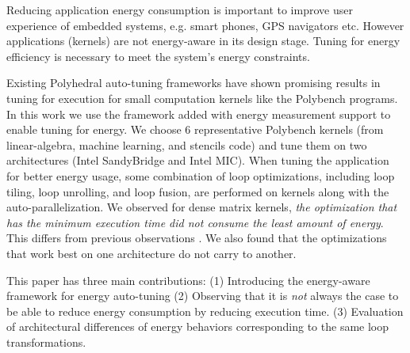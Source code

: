 Reducing application energy consumption is important to improve user experience of 
embedded systems, e.g. smart phones, GPS navigators etc.  
However applications (kernels) are not energy-aware in its design stage. Tuning
for energy efficiency is necessary to meet the system's energy constraints.

Existing Polyhedral auto-tuning frameworks have shown promising results in tuning for execution
for small computation kernels like the Polybench programs\cite{EJ2012}. 
In this work we use the framework added with energy measurement support to enable tuning for energy.
We choose 6 representative Polybench kernels (from linear-algebra, machine learning, and stencils code) 
and tune them on two architectures (Intel SandyBridge and Intel MIC).
When tuning the application for better energy usage, some combination of loop optimizations, including loop 
tiling, loop unrolling, and loop fusion, are performed on kernels along with the auto-parallelization.
We observed for dense matrix kernels, \emph{the optimization that has the minimum execution time 
did not consume the least amount of energy}. This differs from previous observations \cite{Wang2014}.
We also found that the optimizations that work best on one architecture do not carry to another.  
 
This paper has three main contributions: 
(1) Introducing the energy-aware framework for energy auto-tuning
(2) Observing that it is \emph{not} always the case to be able to reduce energy consumption by reducing execution time.
(3) Evaluation of architectural differences of energy behaviors corresponding to the same loop transformations.

%

